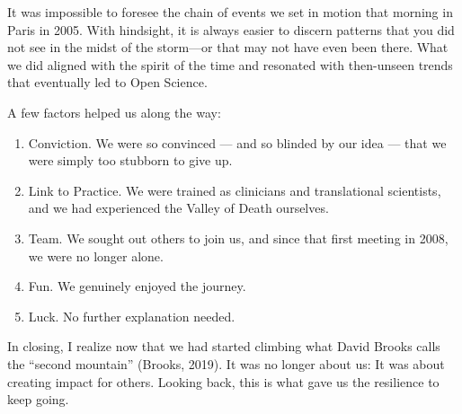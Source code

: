 \documentclass[authordate, editorial, issue]{jote-new-article}
\begin{document}
	It was impossible to foresee the chain of events we set in motion that morning in Paris in 2005. With hindsight, it is always easier to discern patterns that you did not see in the midst of the storm—or that may not have even been there. What we did aligned with the spirit of the time and resonated with then-unseen trends that eventually led to Open Science.



	A few factors helped us along the way:





	\begin{enumerate}


		\item Conviction. We were so convinced — and so blinded by our idea — that we were simply too stubborn to give up.



		\item
		Link to Practice. We were trained as clinicians and translational scientists, and we had experienced the Valley of Death ourselves.



		\item Team. We sought out others to join us, and since that first meeting in 2008, we were no longer alone.



		\item Fun. We genuinely enjoyed the journey.



		\item Luck. No further explanation needed.


	\end{enumerate}





	In closing, I realize now that we had started climbing what David Brooks calls the “second mountain” (Brooks, 2019). It was no longer about us: It was about creating impact for others. Looking back, this is what gave us the resilience to keep going.
\end{document}
